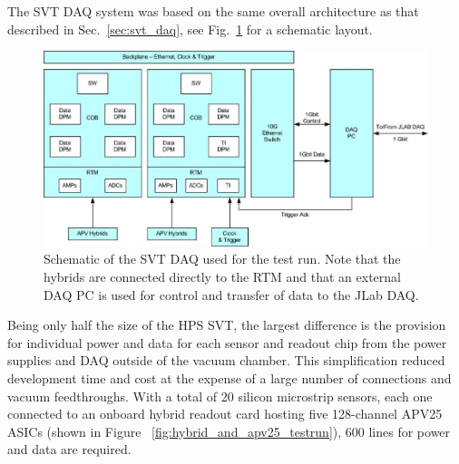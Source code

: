 
The SVT DAQ system was based on the same overall architecture as that 
described in Sec.~\ref{sec:svt_daq}, see Fig.~\ref{fig:svtdaq} for a schematic layout. 
 \begin{figure}[t]
\includegraphics[scale=0.9]{test2012/daq/svt_daq_diagram.png}
\caption{\small{Schematic of the SVT DAQ used for the test run. Note that the hybrids are connected directly 
to the RTM and that an external DAQ PC is used for control and transfer of data to the JLab DAQ.}}
\label{fig:svtdaq}
\end{figure}
Being only half the size of the HPS SVT, the largest difference is the provision for
individual power and data for each sensor and readout chip from the power supplies and DAQ outside of the vacuum chamber.
This simplification reduced development time and cost at the expense of a large number of connections and vacuum feedthroughs.
With a total of 20 silicon microstrip sensors, each one connected to an onboard hybrid readout 
card hosting five 128-channel APV25 ASICs (shown in Figure ~\ref{fig:hybrid_and_apv25_testrun}), 600 lines for power and data are required.
